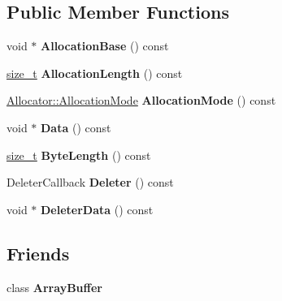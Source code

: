 \subsection*{Public Member Functions}
\begin{DoxyCompactItemize}
\item 
\mbox{\label{classv8_1_1ArrayBuffer_1_1Contents_a6982d157697f42fde9007989c0150d89}} 
void $\ast$ {\bfseries Allocation\+Base} () const
\item 
\mbox{\label{classv8_1_1ArrayBuffer_1_1Contents_abf5ffac83be8c88a602cce7b852f4a62}} 
\mbox{\hyperlink{classsize__t}{size\+\_\+t}} {\bfseries Allocation\+Length} () const
\item 
\mbox{\label{classv8_1_1ArrayBuffer_1_1Contents_a82b2bbacac1a218439f80063af457287}} 
\mbox{\hyperlink{classv8_1_1ArrayBuffer_1_1Allocator_ab106d1fbad7be9f6fd8b0f5c550ac59e}{Allocator\+::\+Allocation\+Mode}} {\bfseries Allocation\+Mode} () const
\item 
\mbox{\label{classv8_1_1ArrayBuffer_1_1Contents_a4eaa3609be49d6fd2055971242c5a6e0}} 
void $\ast$ {\bfseries Data} () const
\item 
\mbox{\label{classv8_1_1ArrayBuffer_1_1Contents_ac4ca77bb59e6cbb004d9edaa79d30ad6}} 
\mbox{\hyperlink{classsize__t}{size\+\_\+t}} {\bfseries Byte\+Length} () const
\item 
\mbox{\label{classv8_1_1ArrayBuffer_1_1Contents_adaa11444494fd9ea3c4444a86c4575ff}} 
Deleter\+Callback {\bfseries Deleter} () const
\item 
\mbox{\label{classv8_1_1ArrayBuffer_1_1Contents_a2c7a852906052acc7cda4a8b38a9a241}} 
void $\ast$ {\bfseries Deleter\+Data} () const
\end{DoxyCompactItemize}
\subsection*{Friends}
\begin{DoxyCompactItemize}
\item 
\mbox{\label{classv8_1_1ArrayBuffer_1_1Contents_acbcb25033a90500a51aa19c811b2a1d3}} 
class {\bfseries Array\+Buffer}
\end{DoxyCompactItemize}


